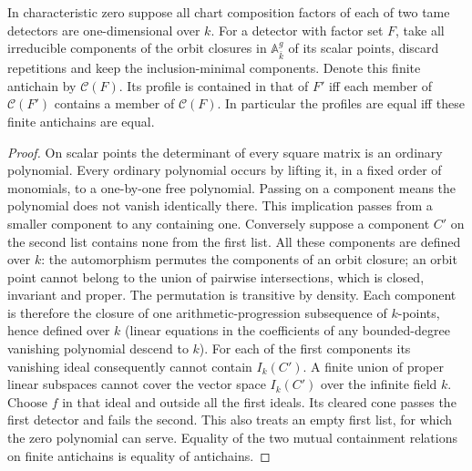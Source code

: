 \documentclass[11pt]{article}
\begin{document}
\begin{cor}\label{scalar}
In characteristic zero suppose all chart composition factors of each
of two tame detectors are one-dimensional over $k$. For a detector
with factor set $F$, take all irreducible components of the orbit
closures in $\mathbb A^g_{\bar k}$ of its scalar points, discard
repetitions and keep the inclusion-minimal components. Denote this
finite antichain by $\mathcal C(F)$. Its profile is contained in that
of $F'$ iff each member of $\mathcal C(F')$ contains a member of
$\mathcal C(F)$. In particular the profiles are equal iff these finite
antichains are equal.
\end{cor}
\begin{proof}
On scalar points the determinant of every square matrix is an ordinary
polynomial. Every ordinary polynomial occurs by lifting it, in a fixed
order of monomials, to a one-by-one free polynomial. Passing on a
component means the polynomial does not vanish identically there.
This implication passes from a smaller component to any containing
one. Conversely suppose a component $C'$ on the second list contains
none from the first list. All these components are defined over $k$:
the automorphism permutes the components of an orbit closure; an
orbit point cannot belong to the union of pairwise intersections,
which is closed, invariant and proper. The permutation is transitive
by density. Each component is therefore the closure of one
arithmetic-progression subsequence of $k$-points, hence defined over
$k$ (linear equations in the coefficients of any bounded-degree
vanishing polynomial descend to $k$). For each of the first components
its vanishing ideal consequently cannot contain $I_k(C')$. A finite
union of proper linear subspaces cannot cover the vector space
$I_k(C')$ over the infinite field $k$. Choose $f$ in that ideal
and outside all the first ideals. Its cleared cone passes the first
detector and fails the second. This also treats an empty first list,
for which the zero polynomial can serve. Equality of the two mutual
containment relations on finite antichains is equality of antichains.
\end{proof}
\end{document}
